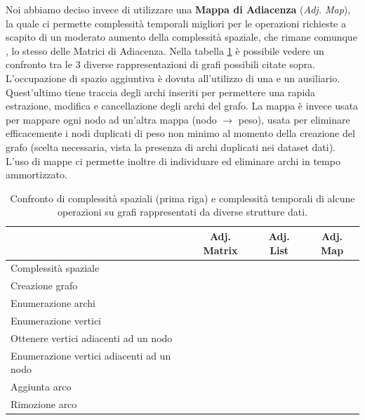 \noindent Noi abbiamo deciso invece di utilizzare una \textbf{Mappa di Adiacenza} (\textit{Adj. Map}), la quale ci permette complessità temporali migliori per le operazioni richieste a scapito di un moderato aumento della complessità spaziale, che rimane comunque \complexityNPlusM{}, lo stesso delle Matrici di Adiacenza. Nella tabella \ref{table:graph-representation-comparison} è possibile vedere un confronto tra le 3 diverse rappresentazioni di grafi possibili citate sopra. \\

\noindent L'occupazione di spazio aggiuntiva è dovuta all'utilizzo di una  e un \newline {} ausiliario. Quest'ultimo tiene traccia degli archi inseriti per permettere una rapida estrazione, modifica e cancellazione degli archi del grafo. La mappa è invece usata per mappare ogni nodo ad un'altra mappa (nodo $\rightarrow{}$ peso), usata per eliminare efficacemente i nodi duplicati di peso non minimo al momento della creazione del grafo (scelta necessaria, vista la presenza di archi duplicati nei dataset dati). L'uso di mappe ci permette inoltre di individuare ed eliminare archi in tempo \complexityConstant{} ammortizzato.

\begin{table}[ht]
\centering
    \begin{tabular}{|l|ccc|}
    \hline
    &  \multicolumn{1}{c}{Adj. Matrix} & \multicolumn{1}{c}{Adj. List} & \multicolumn{1}{c|}{Adj. Map} \\
    \hline
     Complessità spaziale   & \complexityNSquared{}  & \complexityNPlusM{} & \complexityNPlusM{} \\ \hline

     Creazione grafo & \complexityNSquared{}  & \complexityNPlusM{} & \complexityNPlusM{} \\
     Enumerazione archi & \complexityNSquared{} & \complexityM{} & \complexityM{} \\
     Enumerazione vertici & \complexityN{} & \complexityN{} & \complexityN{} \\
     Ottenere vertici adiacenti ad un nodo & \complexityN{} & \complexityNDegree{} & \complexityConstant{} \\
     Enumerazione vertici adiacenti ad un nodo & \complexityN{} & \complexityNDegree{} &  \complexityNDegree{} \\
     Aggiunta arco & \complexityConstant{} & \complexityConstant{} & \complexityConstant{} \\
     Rimozione arco & \complexityConstant{} & \complexityM{} & \complexityConstant{} \\
    \hline
    \end{tabular}
    \caption{Confronto di complessità spaziali (prima riga) e complessità temporali di alcune operazioni su grafi rappresentati da diverse strutture dati.}
    \label{table:graph-representation-comparison}
\end{table}

